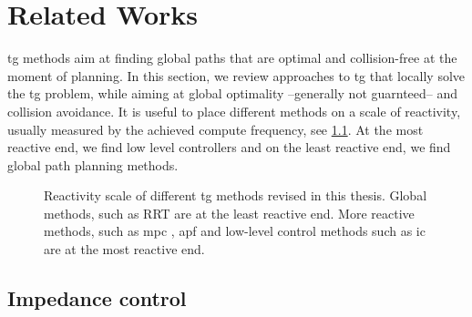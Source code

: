 \chapter{Related Works} %
\label{cha:state}





\newpage


\acl{tg} methods aim at finding
global paths that are optimal and collision-free at the
moment of planning. In this section, we review approaches to
\ac{tg} that locally solve the \ac{tg} problem, while aiming
at global optimality --generally not guarnteed-- and
collision avoidance. It is useful to place different methods
on a scale of reactivity, usually measured by the achieved
compute frequency, see \cref{fig:reactivity_scale}.
At the most reactive end, we find low
level controllers and on the least reactive end, we find
global path planning methods.
\begin{figure}[h]
  \centering
  
  \caption{Reactivity scale of different \ac{tg} methods
  revised in this thesis. Global methods, such as RRT
  \cite{Karaman2011} are at the least reactive end. More
  reactive methods, such as \ac{mpc}
  \cite{hewing2020learning}, \ac{apf} \cite{Khatib1985} and
  low-level control methods such as \ac{ic} \cite{hogan1985impedance}
  are at the most reactive end.}
  \label{fig:reactivity_scale}
\end{figure}


\section{Impedance control}%
\label{sec:impedance_control}

